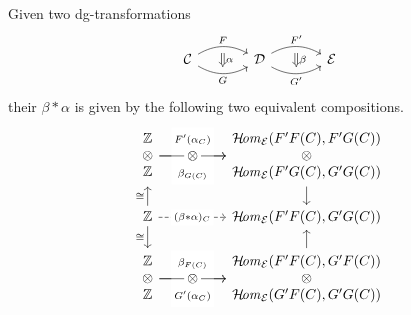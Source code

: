 {Given two dg-transformations 
\[
\begin{tikzcd}[column sep=large, row sep=large]
{\Cc}
\ar[r,bend left,"{F}",""{name=a,below}]
\ar[r,bend right,"{G}"',""{name=b}]
\ar[Rightarrow,from=a,to=b,"{\alpha}"]&
{\Dd}
\ar[r,bend left,"{F'}",""{name=a,below}]
\ar[r,bend right,"{G'}"',""{name=b}]
\ar[Rightarrow,from=a,to=b,"{\beta}"]&
{\Ee}
\end{tikzcd}
\]
their  $\beta\ast\alpha$ is given by
the following two equivalent compositions.
\[
\begin{tikzcd}[column sep=huge, row sep=scriptsize]
{
\begin{matrix}
\ZZ \\
\otimes \\
\ZZ
\end{matrix}
}
\ar[r,"{
\begin{matrix}
F'(\alpha_C)\\
\\
\beta_{G(C)}
\end{matrix}
}"description]
\ar[r,"\textstyle{\otimes}"description]
&
{
\begin{matrix}
\HHom_{\Ee}(F'F(C),F'G(C)) \\
\otimes \\
\HHom_{\Ee}(F'G(C),G'G(C))
\end{matrix}
}\ar[d]\\
{\ZZ}\ar[u,"{\cong}"]\ar[d,"{\cong}"']
\ar[r,dashed,"{(\beta\ast\alpha)_C}"description]&
\HHom_{\Ee}(F'F(C),G'G(C)) \\
{
\begin{matrix}
\ZZ \\
\otimes \\
\ZZ
\end{matrix}
}
\ar[r,"{
\begin{matrix}
\beta_{F(C)}\\
\\
G'(\alpha_C)
\end{matrix}
}"description]
\ar[r,"\textstyle{\otimes}"description]
&
{
\begin{matrix}
\HHom_{\Ee}(F'F(C),G'F(C)) \\
\otimes \\
\HHom_{\Ee}(G'F(C),G'G(C))
\end{matrix}
}\ar[u]
\end{tikzcd}
\]
}

